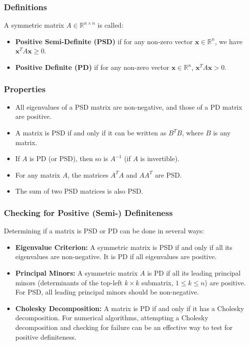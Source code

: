 \documentclass[8pt, a4paper, landscape, includeheadfoot]{extarticle}
\begin{document}
\begin{multicols*}{4}
	\subsubsection{Definitions}{}
	A symmetric matrix \( A \in \mathbb{R}^{n \times n} \) is called:
	\begin{itemize}[itemsep=0pt]
		\item \textbf{Positive Semi-Definite (PSD)} if for any non-zero vector \( \mathbf{x} \in \mathbb{R}^n \), we have \( \mathbf{x}^T A \mathbf{x} \geq 0 \).
		\item \textbf{Positive Definite (PD)} if for any non-zero vector \( \mathbf{x} \in \mathbb{R}^n \), \( \mathbf{x}^T A \mathbf{x} > 0 \).
	\end{itemize}

	\subsubsection{Properties}{}
	\begin{itemize}[itemsep=0pt]
		\item All eigenvalues of a PSD matrix are non-negative, and those of a PD matrix are positive.
		\item A matrix is PSD if and only if it can be written as \( B^T B \), where \( B \) is any matrix.
		\item If \( A \) is PD (or PSD), then so is \( A^{-1} \) (if \( A \) is invertible).
		\item For any matrix \( A \), the matrices \( A^T A \) and \( AA^T \) are PSD.
		\item The sum of two PSD matrices is also PSD.
	\end{itemize}

	\subsubsection{Checking for Positive (Semi-) Definiteness}{}
	Determining if a matrix is PSD or PD can be done in several ways:

	\begin{itemize}[itemsep=0pt]
		\item \textbf{Eigenvalue Criterion:} A symmetric matrix is PSD if and only if all its eigenvalues are non-negative. It is PD if all eigenvalues are positive.
		\item \textbf{Principal Minors:} A symmetric matrix \( A \) is PD if all its leading principal minors (determinants of the top-left \( k \times k \) submatrix, \( 1 \leq k \leq n \)) are positive. For PSD, all leading principal minors should be non-negative.
		\item \textbf{Cholesky Decomposition:} A matrix is PD if and only if it has a Cholesky decomposition. For numerical algorithms, attempting a Cholesky decomposition and checking for failure can be an effective way to test for positive definiteness.
	\end{itemize}


\end{multicols*}
\end{document}
